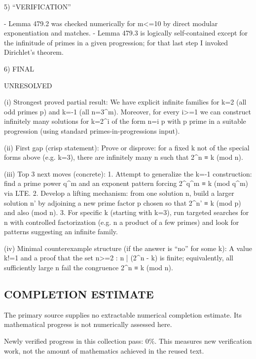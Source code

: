 5) “VERIFICATION”

- Lemma 479.2 was checked numerically for m<=10 by direct modular exponentiation and matches.
- Lemma 479.3 is logically self-contained except for the infinitude of primes in a given progression; for that last step I invoked Dirichlet's theorem.

6) FINAL

UNRESOLVED

(i) Strongest proved partial result:
We have explicit infinite families for k=2 (all odd primes p) and k=-1 (all n=3^m). Moreover, for every i>=1 we can construct infinitely many solutions for k=2^i of the form n=i p with p prime in a suitable progression (using standard primes-in-progressions input).

(ii) First gap (crisp statement):
Prove or disprove: for a fixed k not of the special forms above (e.g. k=3), there are infinitely many n such that 2^n ≡ k (mod n).

(iii) Top 3 next moves (concrete):
1. Attempt to generalize the k=-1 construction: find a prime power q^m and an exponent pattern forcing 2^{q^m} ≡ k (mod q^m) via LTE.
2. Develop a lifting mechanism: from one solution n, build a larger solution n' by adjoining a new prime factor p chosen so that 2^{n'} ≡ k (mod p) and also (mod n).
3. For specific k (starting with k=3), run targeted searches for n with controlled factorization (e.g. n a product of a few primes) and look for patterns suggesting an infinite family.

(iv) Minimal counterexample structure (if the answer is “no” for some k):
A value k!=1 and a proof that the set { n>=2 : n | (2^n - k) } is finite; equivalently, all sufficiently large n fail the congruence 2^n ≡ k (mod n).



\subsection*{COMPLETION ESTIMATE}
The primary source supplies no extractable numerical completion estimate. Its mathematical progress is not numerically assessed here.

Newly verified progress in this collection pass: $0\%$. This measures new verification work, not the amount of mathematics achieved in the reused text.
